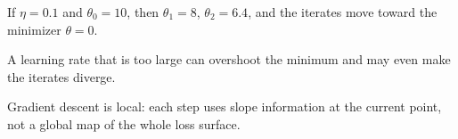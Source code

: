 \documentclass[11pt]{article}
\begin{document}
\begin{examplebox}
If $\eta = 0.1$ and $\theta_0 = 10$, then $\theta_1 = 8$, $\theta_2 = 6.4$, and the iterates move toward the minimizer $\theta=0$.
\end{examplebox}

\begin{warningbox}
A learning rate that is too large can overshoot the minimum and may even make the iterates diverge.
\end{warningbox}

\begin{resultbox}
Gradient descent is local: each step uses slope information at the current point, not a global map of the whole loss surface.
\end{resultbox}
\end{document}
